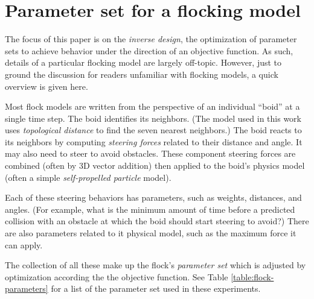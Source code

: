 \documentclass[letterpaper]{article}
\begin{document}
\section{Parameter set for a flocking model}
\label{sec:parameter_set}

The focus of this paper is on the \textit{inverse design}, the optimization of parameter sets to achieve behavior under the direction of an objective function. As such, details of a particular flocking model are largely off-topic. However, just to ground the discussion for readers unfamiliar with flocking models, a quick overview is given here.

Most flock models are written from the perspective of an individual ``boid'' at a single time step. The boid identifies its neighbors. (The model used in this work uses \textit{topological distance} to find the seven nearest neighbors.) The boid reacts to its neighbors by computing \textit{steering forces} related to their distance and angle. It may also need to steer to avoid obstacles. These component steering forces are combined (often by 3D vector addition) then applied to the boid's physics model (often a simple \textit{self-propelled particle} model).

Each of these steering behaviors has parameters, such as weights, distances, and angles. (For example, what is the minimum amount of time before a predicted collision with an obstacle at which the boid should start steering to avoid?) There are also parameters related to it physical model, such as the maximum force it can apply.

The collection of all these make up the flock's \textit{parameter set} which is adjusted by optimization according the the objective function. See Table \ref{table:flock-parameters} for a list of the parameter set used in these experiments.


\end{document}
